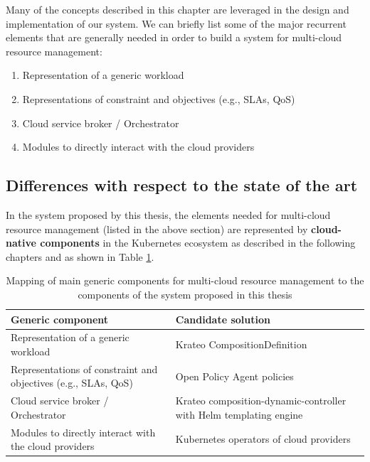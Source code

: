 Many of the concepts described in this chapter are leveraged in the design and implementation of our system. 
We can briefly list some of the major recurrent elements that are generally needed in order to build a system for multi-cloud resource management:
\begin{enumerate}
    \item Representation of a generic workload
    \item Representations of constraint and objectives (e.g., SLAs, QoS)
    \item Cloud service broker / Orchestrator
    \item Modules to directly interact with the cloud providers
\end{enumerate}

\subsection{Differences with respect to the state of the art}

In the system proposed by this thesis, the elements needed for multi-cloud resource management (listed in the above section) are represented by \textbf{cloud-native components} in the Kubernetes ecosystem as described in the following chapters and as shown in Table \ref{tab:components_mapping}.

\begin{table}[t]
  \centering
  \renewcommand{\arraystretch}{1.3} %
  \begin{tabularx}{\textwidth}{| l | X |} %
    \hline
    \textbf{Generic component} & \textbf{Candidate solution} \\
    \hline
    Representation of a generic workload & Krateo CompositionDefinition \\
    \hline
    Representations of constraint and objectives (e.g., SLAs, QoS) & Open Policy Agent policies \\
    \hline
    Cloud service broker / Orchestrator & Krateo composition-dynamic-controller with Helm templating engine \\
    \hline
    Modules to directly interact with the cloud providers & Kubernetes operators of cloud providers \\
    \hline
  \end{tabularx}
  \caption{Mapping of main generic components for multi-cloud resource management to the components of the system proposed in this thesis}
  \label{tab:components_mapping}
\end{table}

